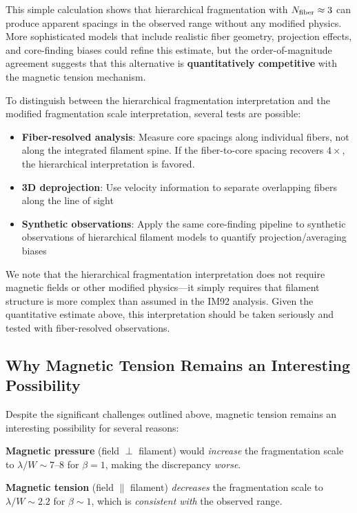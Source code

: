 \documentclass[11pt,a4paper]{article}
\begin{document}
This simple calculation shows that hierarchical fragmentation with $N_{\rm fiber} \approx 3$ can produce apparent spacings in the observed range without any modified physics. More sophisticated models that include realistic fiber geometry, projection effects, and core-finding biases could refine this estimate, but the order-of-magnitude agreement suggests that this alternative is \textbf{quantitatively competitive} with the magnetic tension mechanism.

To distinguish between the hierarchical fragmentation interpretation and the modified fragmentation scale interpretation, several tests are possible:
\begin{itemize}
    \item \textbf{Fiber-resolved analysis}: Measure core spacings along individual fibers, not along the integrated filament spine. If the fiber-to-core spacing recovers $4\times$, the hierarchical interpretation is favored.
    \item \textbf{3D deprojection}: Use velocity information to separate overlapping fibers along the line of sight
    \item \textbf{Synthetic observations}: Apply the same core-finding pipeline to synthetic observations of hierarchical filament models to quantify projection/averaging biases
\end{itemize}

We note that the hierarchical fragmentation interpretation does not require magnetic fields or other modified physics—it simply requires that filament structure is more complex than assumed in the IM92 analysis. Given the quantitative estimate above, this interpretation should be taken seriously and tested with fiber-resolved observations.

\subsection{Why Magnetic Tension Remains an Interesting Possibility}

Despite the significant challenges outlined above, magnetic tension remains an interesting possibility for several reasons:

\textbf{Magnetic pressure} (field $\perp$ filament) would \textit{increase} the fragmentation scale to $\lambda/W \sim 7$--$8$ for $\beta = 1$, making the discrepancy \textit{worse}.

\textbf{Magnetic tension} (field $\parallel$ filament) \textit{decreases} the fragmentation scale to $\lambda/W \sim 2.2$ for $\beta \sim 1$, which is \textit{consistent with} the observed range.
\end{document}
